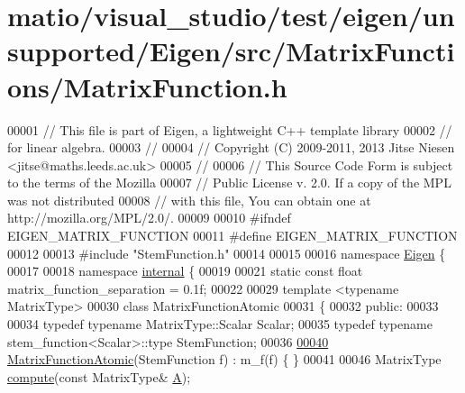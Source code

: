 \hypertarget{matio_2visual__studio_2test_2eigen_2unsupported_2_eigen_2src_2_matrix_functions_2_matrix_function_8h_source}{}\section{matio/visual\+\_\+studio/test/eigen/unsupported/\+Eigen/src/\+Matrix\+Functions/\+Matrix\+Function.h}
\label{matio_2visual__studio_2test_2eigen_2unsupported_2_eigen_2src_2_matrix_functions_2_matrix_function_8h_source}

\begin{DoxyCode}
00001 \textcolor{comment}{// This file is part of Eigen, a lightweight C++ template library}
00002 \textcolor{comment}{// for linear algebra.}
00003 \textcolor{comment}{//}
00004 \textcolor{comment}{// Copyright (C) 2009-2011, 2013 Jitse Niesen <jitse@maths.leeds.ac.uk>}
00005 \textcolor{comment}{//}
00006 \textcolor{comment}{// This Source Code Form is subject to the terms of the Mozilla}
00007 \textcolor{comment}{// Public License v. 2.0. If a copy of the MPL was not distributed}
00008 \textcolor{comment}{// with this file, You can obtain one at http://mozilla.org/MPL/2.0/.}
00009 
00010 \textcolor{preprocessor}{#ifndef EIGEN\_MATRIX\_FUNCTION}
00011 \textcolor{preprocessor}{#define EIGEN\_MATRIX\_FUNCTION}
00012 
00013 \textcolor{preprocessor}{#include "StemFunction.h"}
00014 
00015 
00016 \textcolor{keyword}{namespace }\hyperlink{namespace_eigen}{Eigen} \{ 
00017 
00018 \textcolor{keyword}{namespace }\hyperlink{namespaceinternal}{internal} \{
00019 
00021 \textcolor{keyword}{static} \textcolor{keyword}{const} \textcolor{keywordtype}{float} matrix\_function\_separation = 0.1f;
00022 
00029 \textcolor{keyword}{template} <\textcolor{keyword}{typename} MatrixType>
00030 \textcolor{keyword}{class }MatrixFunctionAtomic 
00031 \{
00032   \textcolor{keyword}{public}:
00033 
00034     \textcolor{keyword}{typedef} \textcolor{keyword}{typename} MatrixType::Scalar Scalar;
00035     \textcolor{keyword}{typedef} \textcolor{keyword}{typename} stem\_function<Scalar>::type StemFunction;
00036 
\hyperlink{class_eigen_1_1internal_1_1_matrix_function_atomic_a0786bb0349fe5ca5f8df13db7e21e882}{00040}     \hyperlink{class_eigen_1_1internal_1_1_matrix_function_atomic_a0786bb0349fe5ca5f8df13db7e21e882}{MatrixFunctionAtomic}(StemFunction f) : m\_f(f) \{ \}
00041 
00046     MatrixType \hyperlink{class_eigen_1_1internal_1_1_matrix_function_atomic_a704ccdc87d66cb6f93d16e0a0b9e8acf}{compute}(\textcolor{keyword}{const} MatrixType& \hyperlink{group___core___module_class_eigen_1_1_matrix}{A});

\end{DoxyCode}
